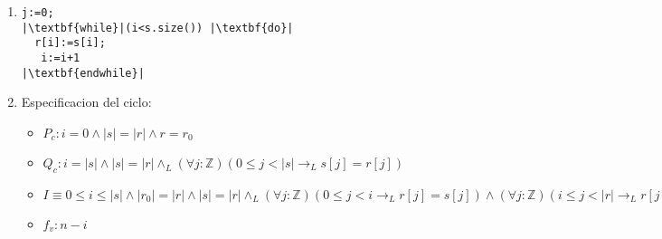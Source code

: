 \documentclass{article}
\begin{document}
\noindent
\begin{enumerate}[label=\alph*)]
	\item 

\begin{lstlisting}
j:=0;
|\textbf{while}|(i<s.size()) |\textbf{do}|
  r[i]:=s[i];
   i:=i+1
|\textbf{endwhile}|
\end{lstlisting}
	\item
	
 Especificacion del ciclo:
	\begin{itemize}
		\item $P_c: i=0 \wedge |s|=|r|\wedge r=r_0$
		\item $Q_c: i=|s|\wedge |s|=|r|\wedge_L (\forall j:\mathbb{Z})(0\leq j<|s|\rightarrow_L s[j]=r[j])$
		\item $I\equiv 0\leq i\leq |s|\wedge |r_0|=|r|\wedge |s|=|r|\wedge_L (\forall j:\mathbb{Z})(0\leq j<i \rightarrow_L r[j]=s[j])\wedge
		 (\forall j:\mathbb{Z})(i\leq j<|r|\rightarrow_L r[j]=r_0[j])$
		\item $f_v:n-i$
	\end{itemize}
	

\end{enumerate}
\end{document}
